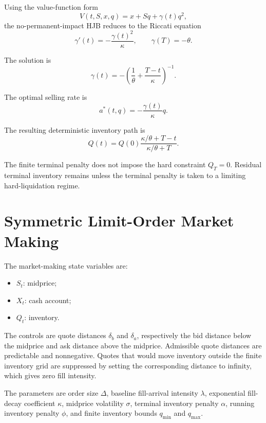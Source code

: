 \documentclass[11pt]{article}
\begin{document}
Using the value-function form
\begin{equation}
V(t,S,x,q)=x+Sq+\gamma(t)q^2,
\end{equation}
the no-permanent-impact HJB reduces to the Riccati equation
\begin{equation}
\gamma'(t)=-\frac{\gamma(t)^2}{\kappa},
\qquad
\gamma(T)=-\theta.
\end{equation}

The solution is
\begin{equation}
\gamma(t)
=-\left(\frac{1}{\theta}+\frac{T-t}{\kappa}\right)^{-1}.
\end{equation}

The optimal selling rate is
\begin{equation}
a^*(t,q)
=-\frac{\gamma(t)}{\kappa}q.
\end{equation}

The resulting deterministic inventory path is
\begin{equation}
Q(t)
=Q(0)\frac{\kappa/\theta+T-t}{\kappa/\theta+T}.
\end{equation}

The finite terminal penalty does not impose the hard constraint $Q_T=0$. Residual terminal inventory remains unless the terminal penalty is taken to a limiting hard-liquidation regime.

\section{Symmetric Limit-Order Market Making}

The market-making state variables are:
\begin{itemize}[itemsep=2pt]
    \item $S_t$: midprice;
    \item $X_t$: cash account;
    \item $Q_t$: inventory.
\end{itemize}

The controls are quote distances $\delta_b$ and $\delta_a$, respectively the bid distance below the midprice and ask distance above the midprice. Admissible quote distances are predictable and nonnegative. Quotes that would move inventory outside the finite inventory grid are suppressed by setting the corresponding distance to infinity, which gives zero fill intensity.

The parameters are order size $\Delta$, baseline fill-arrival intensity $\lambda$, exponential fill-decay coefficient $\kappa$, midprice volatility $\sigma$, terminal inventory penalty $\alpha$, running inventory penalty $\phi$, and finite inventory bounds $q_{\min}$ and $q_{\max}$.
\end{document}
